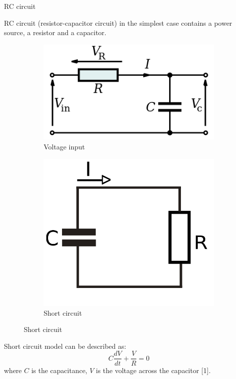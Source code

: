 \documentclass{beamer}
\begin{document}
\begin{frame}{RC circuit}
	\begin{flushleft}
		
		RC circuit (resistor-capacitor circuit) in the simplest case contains a power source, a resistor and a capacitor.
\begin{figure}
	\centering
	\begin{subfigure}[b]{0.5\textwidth}
		\centering
		\includegraphics[width=\textwidth]{RC_1}
		\caption{Voltage input}
	\end{subfigure}
	\begin{subfigure}[b]{0.3\textwidth}
		\centering
		\includegraphics[width=\textwidth]{RC_2}
		\caption{Short circuit}
	\end{subfigure}
\end{figure}
		Short circuit model can be described as:
		\begin{equation}
			C \frac{dV}{dt} + \frac{V}{R} = 0
		\end{equation}
		where $C$ is the capacitance, $V$ is the voltage across the capacitor [1]. 
		
	\end{flushleft}
\end{frame}
\end{document}
